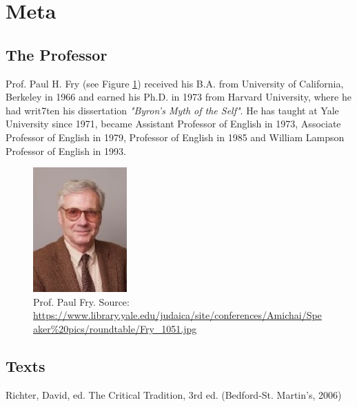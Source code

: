 \documentclass[]{scrartcl}
\begin{document}
\section{Meta}
\subsection{The Professor}
Prof. Paul H. Fry (see Figure \ref{fig:paul_fry}) received his B.A. from University of California, Berkeley in 1966 and earned his Ph.D. in 1973 from Harvard University, where he had writ7ten his dissertation \emph{"Byron’s Myth of the Self"}. He has taught at Yale University since 1971, became Assistant Professor of English in 1973, Associate Professor of English in 1979, Professor of English in 1985 and William Lampson Professor of English in 1993.

\begin{figure}[]
	\centering
	\includegraphics[width=0.32\textwidth]{images/paul_fry.jpg}
	\caption{Prof. Paul Fry. Source: \url{https://www.library.yale.edu/judaica/site/conferences/Amichai/Speaker\%20pics/roundtable/Fry_1051.jpg}}
	\label{fig:paul_fry}
\end{figure}

\subsection{Texts}

Richter, David, ed. The Critical Tradition, 3rd ed. (Bedford-St. Martin's, 2006)
\end{document}
